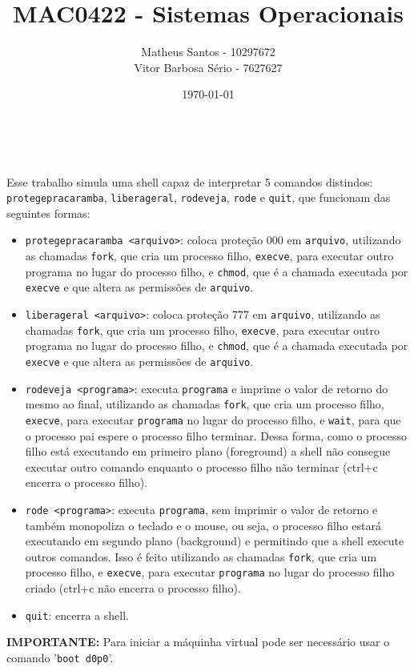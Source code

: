 \documentclass[12pt, a4paper]{article}
\title{MAC0422 - Sistemas Operacionais}
\author{Matheus Santos - 10297672 \\ Vitor Barbosa Sério - 7627627}
\date{\today}
\begin{document}
\makeatletter
\begin{flushright}
\@date
\end{flushright}
\begin{center}
{\Large \@title \\}
{\large \@author}
\end{center}
\makeatother

Esse trabalho simula uma shell capaz de interpretar 5 comandos distindos: \texttt{protegepracaramba}, \texttt{liberageral}, \texttt{rodeveja}, \texttt{rode} e \texttt{quit}, que funcionam das seguintes formas:

\begin{itemize}
\item \texttt{protegepracaramba <arquivo>}: coloca proteção 000 em \texttt{arquivo}, utilizando as chamadas \texttt{fork}, que cria um processo filho, \texttt{execve}, para executar outro programa no lugar do processo filho, e \texttt{chmod}, que é a chamada executada por \texttt{execve} e que altera as permissões de \texttt{arquivo}.


\item \texttt{liberageral <arquivo>}: coloca proteção 777 em \texttt{arquivo}, utilizando as chamadas \texttt{fork}, que cria um processo filho, \texttt{execve}, para executar outro programa no lugar do processo filho, e \texttt{chmod}, que é a chamada executada por \texttt{execve} e que altera as permissões de \texttt{arquivo}.


\item \texttt{rodeveja <programa>}: executa \texttt{programa} e imprime o valor de retorno do mesmo ao final, utilizando as chamadas \texttt{fork}, que cria um processo filho, \texttt{execve}, para executar \texttt{programa} no lugar do processo filho, e \texttt{wait}, para que o processo pai espere o processo filho terminar. Dessa forma, como o processo filho está executando em primeiro plano (foreground) a shell não consegue executar outro comando enquanto o processo filho não terminar (ctrl+c encerra o processo filho).
\item \texttt{rode <programa>}: executa \texttt{programa}, sem imprimir o valor de retorno e também monopoliza o teclado e o mouse, ou seja, o processo filho estará executando em segundo plano (background) e permitindo que a shell execute outros comandos. Isso é feito utilizando as chamadas \texttt{fork}, que cria um processo filho, e \texttt{execve}, para executar \texttt{programa} no lugar do processo filho criado (ctrl+c não encerra o processo filho).
\item \texttt{quit}: encerra a shell.
\end{itemize}

\textbf{IMPORTANTE:} Para iniciar a máquinha virtual pode ser necessário usar o comando '\texttt{boot d0p0}'.
\end{document}
